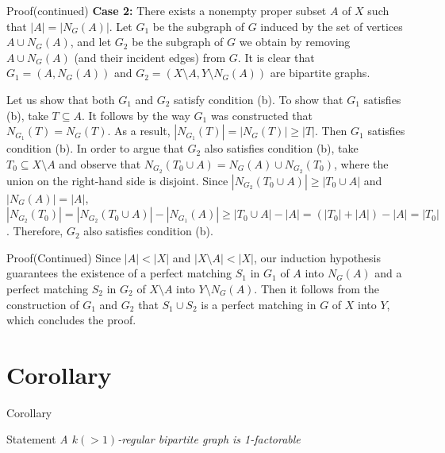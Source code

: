 \documentclass{beamer}
\begin{document}
   \begin{frame}{Proof(continued)}
   	  	\textbf{Case 2:} There exists a nonempty proper subset $A$ of $X$ such that $|A| = |N_G(A)|$. Let $G_1$ be the subgraph of $G$ induced by the set of vertices $A \cup N_G(A)$, and let $G_2$ be the subgraph of $G$ we obtain by removing $A \cup N_G(A)$ (and their incident edges) from $G$. It is clear that $G_1 = (A, N_G(A))$ and $G_2 = (X \setminus A, Y \setminus N_G(A))$ are bipartite graphs.
   	  
   	  Let us show that both $G_1$ and $G_2$ satisfy condition (b). To show that $G_1$ satisfies (b), take $T \subseteq A$. It follows by the way $G_1$ was constructed that $N_{G_1}(T) = N_G(T)$. As a result, $|N_{G_1}(T)| = |N_G(T)| \geq |T|$. Then $G_1$ satisfies condition (b). In order to argue that $G_2$ also satisfies condition (b), take $T_0 \subseteq X \setminus A$ and observe that $N_{G_2}(T_0 \cup A) = N_G(A) \cup N_{G_2}(T_0)$, where the union on the right-hand side is disjoint. Since $|N_{G_2}(T_0 \cup A)| \geq |T_0 \cup A|$ and $|N_G(A)| = |A|$, $|N_{G_2}(T_0)| = |N_{G_2}(T_0 \cup A)| - |N_{G_1}(A)| \geq |T_0 \cup A| - |A| = (|T_0| + |A|) - |A| = |T_0|$. Therefore, $G_2$ also satisfies condition (b).
   \end{frame}
    
    \begin{frame}{Proof(Continued)}
    	Since $|A| < |X|$ and $|X \setminus A| < |X|$, our induction hypothesis guarantees the existence of a perfect matching $S_1$ in $G_1$ of $A$ into $N_G(A)$ and a perfect matching $S_2$ in $G_2$ of $X \setminus A$ into $Y \setminus N_G(A)$. Then it follows from the construction of $G_1$ and $G_2$ that $S_1 \cup S_2$ is a perfect matching in $G$ of $X$ into $Y$, which concludes the proof.
    \end{frame}

	\section{Corollary}
	\begin{frame}{Corollary}
		\begin{block}{Statement}
			\textit{A $k(>1)$-regular bipartite graph is 1-factorable}
		\end{block}
		
	\end{frame}
     
\end{document}
